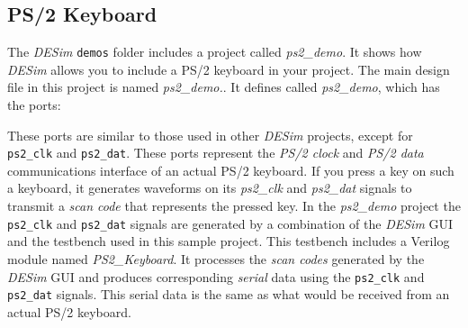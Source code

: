 {\subsection{PS/2 Keyboard}

The {\it DESim} \texttt{demos} folder includes a project called {\it ps2\_demo}. It shows how 
{\it DESim} allows you to include a PS/2 keyboard in your project.  The main design file in 
this project is named 
{\it ps2\_demo.\hdlFileExt }. It defines \fi
called {\it ps2\_demo}, which has the ports:

\vspace{-0.5cm}
\begin{center}
\begin{minipage}[h]{15 cm}
\ifverilog
    \ifnotSV
        
    \else
        
    \fi
\else
	
\fi
\end{minipage}
\end{center}

\vspace{-0.5cm}
These ports are similar to those used in other {\it DESim} projects, except for 
\texttt{ps2\_clk} and \texttt{ps2\_dat}. These ports represent the {\it PS/2 clock} and 
{\it PS/2 data} communications interface of an actual PS/2 keyboard. If you press a key on
such a keyboard, it generates waveforms on its {\it ps2\_clk} and {\it ps2\_dat} signals to 
transmit a {\it scan code} that represents the pressed key. In the {\it ps2\_demo} project 
the \texttt{ps2\_clk} and \texttt{ps2\_dat} signals are generated by a combination of the
{\it DESim} GUI and the testbench used in this sample project. This testbench
includes a Verilog module named {\it PS2\_Keyboard}. It processes the {\it scan codes}
generated by the {\it DESim} GUI and produces corresponding {\it serial} data using the
\texttt{ps2\_clk} and \texttt{ps2\_dat} signals. This serial data is the same as what
would be received from an actual PS/2 keyboard.

}

